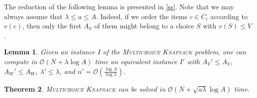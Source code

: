 \documentclass{article}
\theoremstyle{plain}
\newtheorem{theorem}{Theorem}[section]
\newtheorem{lemma}[theorem]{Lemma}
\theoremstyle{definition}
\newcommand{\MK}{\textsc{Multichoice Knapsack}\xspace}
\newcommand{\Oh}{\mathcal{O}}
\begin{document}
  
  
  The reduction of the following lemma is presented in \cref{ss}.
  Note that we may always assume that $\lambda \le a \le A$.
  Indeed, if we order the items $c\in C_i$ according to $v(c)$, 
  then only the first $A_V$ of them might belong to a choice $S$ with $v(S)\le V$. 

\begin{lemma}\label{lem:knapred2}
    Given an instance $I$ of the \MK problem, one can compute in $\Oh(N+\lambda\log A)$ time
    an equivalent instance $I'$ with $A_V'\le A_V$, $A_W'\le A_W$,
    $\lambda'\le \lambda$, and $n'=\Oh(\frac{\log A}{\log \lambda})$.
    \end{lemma}

  \begin{theorem}\label{thm:knap}
    \MK can be solved in $\Oh(N+\sqrt{a\lambda}\log A)$ time.
  \end{theorem}
\end{document}
